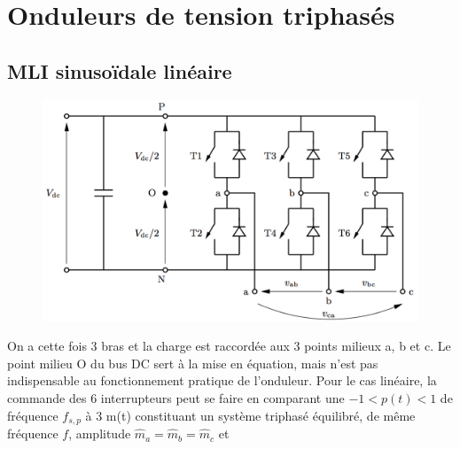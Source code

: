 \section{Onduleurs de tension triphasés}
	\subsection{MLI sinusoïdale linéaire}
		\begin{figure}
		\vspace{-5mm}
		\includegraphics[scale=0.25]{ch4/22}
		\end{figure}
		On a cette fois 3 bras et la charge est raccordée aux 3 points milieux a, b et c. Le point milieu O du bus DC sert à la mise en équation, mais n'est pas indispensable au fonctionnement pratique de l'onduleur. Pour le cas linéaire, la commande des 6 interrupteurs peut se faire en comparant une $-1< p(t)<1$ de fréquence $f_{s,p}$ à 3 m(t) constituant un système triphasé équilibré, de même fréquence $f$, amplitude $\hat{m}_a=\hat{m}_b=\hat{m}_c$ et 
		
